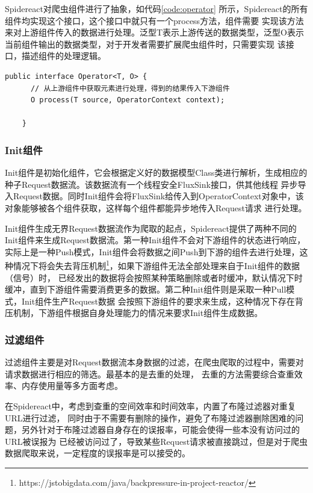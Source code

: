 \documentclass[master]{njuthesis}
\begin{document}
Spidereact对爬虫组件进行了抽象，如代码\ref{code:operator} 所示，Spidereact的所有组件均实现这个接口，这个接口中就只有一个process方法，组件需要
实现该方法来对上游组件传入的数据进行处理。泛型T表示上游传送的数据类型，泛型O表示当前组件输出的数据类型，对于开发者需要扩展爬虫组件时，只需要实现
该接口，描述组件的处理逻辑。
\begin{lstlisting}[label = code:operator, caption = {Operator接口}]
    public interface Operator<T, O> {
      // 从上游组件中获取元素进行处理，得到的结果传入下游组件
      O process(T source, OperatorContext context);

    }
\end{lstlisting}

\subsubsection{Init组件}
Init组件是初始化组件，它会根据定义好的数据模型Class类进行解析，生成相应的种子Request数据流。该数据流有一个线程安全FluxSink接口，供其他线程
异步导入Request数据。同时Init组件会将FluxSink给传入到OperatorContext对象中，该对象能够被各个组件获取，这样每个组件都能异步地传入Request请求
进行处理。

Init组件生成无界Request数据流作为爬取的起点，Spidereact提供了两种不同的Init组件来生成Request数据流。第一种Init组件不会对下游组件的状态进行响应，
实际上是一种Push模式，Init组件会将数据之间Push到下游的组件去进行处理，这种情况下将会失去背压机制\footnote{https://jstobigdata.com/java/backpressure-in-project-reactor/}，如果下游组件无法全部处理来自于Init组件的数据（信号）时，
已经发出的数据将会按照某种策略删除或者时缓冲，默认情况下时缓冲，直到下游组件需要消费更多的数据。第二种Init组件则是采取一种Pull模式，Init组件生产Request数据
会按照下游组件的要求来生成，这种情况下存在背压机制，下游组件根据自身处理能力的情况来要求Init组件生成数据。


\subsubsection{过滤组件}

过滤组件主要是对Request数据流本身数据的过滤，在爬虫爬取的过程中，需要对请求数据进行相应的筛选。最基本的是去重的处理，
去重的方法需要综合查重效率、内存使用量等多方面考虑。

在Spidereact中，考虑到查重的空间效率和时间效率，内置了布隆过滤器对重复URL进行过滤，
同时由于不需要有删除的操作，避免了布隆过滤器删除困难的问题，另外针对于布隆过滤器自身存在的误报率，可能会使得一些本没有访问过的URL被误报为
已经被访问过了，导致某些Request请求被直接跳过，但是对于爬虫数据爬取来说，一定程度的误报率是可以接受的。
\end{document}
